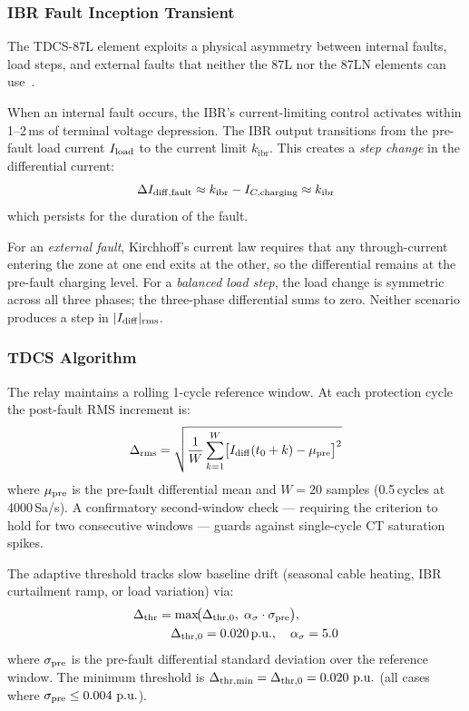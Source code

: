 \documentclass[journal,twoside,10pt]{IEEEtran}
\newcommand{\Idiff}{I_{\mathrm{diff}}}
\newcommand{\kibr}{k_{\mathrm{ibr}}}
\newcommand{\pu}{\,\text{p.u.}}
\begin{document}
\subsubsection{IBR Fault Inception Transient}

The TDCS-87L element exploits a physical asymmetry between internal faults,
load steps, and external faults that neither the 87L nor the 87LN elements
can use~\cite{SAMBP_TR23}.

When an internal fault occurs, the IBR's current-limiting control activates
within 1--2\,ms of terminal voltage depression.  The IBR output transitions
from the pre-fault load current $I_{\rm load}$ to the current limit $\kibr$.
This creates a \emph{step change} in the differential current:
\begin{equation}
  \Delta I_{\rm diff,fault} \approx \kibr - I_{C,\rm charging} \approx \kibr
  \label{eq:tdcs_step}
\end{equation}
which persists for the duration of the fault.

For an \emph{external fault}, Kirchhoff's current law requires that any
through-current entering the zone at one end exits at the other, so the
differential remains at the pre-fault charging level.
For a \emph{balanced load step}, the load change is symmetric across all
three phases; the three-phase differential sums to zero.
Neither scenario produces a step in $|\Idiff|_{\rm rms}$.

\subsubsection{TDCS Algorithm}

The relay maintains a rolling 1-cycle reference window.
At each protection cycle the post-fault RMS increment is:
\begin{equation}
  \Delta_{\rm rms} = \sqrt{\frac{1}{W}\sum_{k=1}^{W}
    \bigl[\Idiff(t_0+k) - \mu_{\rm pre}\bigr]^2}
  \label{eq:tdcs}
\end{equation}
where $\mu_{\rm pre}$ is the pre-fault differential mean and $W = 20$
samples (0.5\,cycles at 4000\,Sa/s).  A confirmatory second-window check
--- requiring the criterion to hold for two consecutive windows --- guards
against single-cycle CT saturation spikes.

The adaptive threshold tracks slow baseline drift (seasonal cable heating,
IBR curtailment ramp, or load variation) via:
\begin{equation}
  \begin{split}
  \Delta_{\rm thr} &= \max\!\bigl(\Delta_{\rm thr,0},\;
                     \alpha_\sigma \cdot \sigma_{\rm pre}\bigr), \\
  &\quad \Delta_{\rm thr,0} = 0.020\pu,\quad \alpha_\sigma = 5.0
  \end{split}
  \label{eq:tdcs_thr}
\end{equation}
where $\sigma_{\rm pre}$ is the pre-fault differential standard deviation
over the reference window.  The minimum threshold is
$\Delta_{\rm thr,min} = \Delta_{\rm thr,0} = 0.020\,\pu$
(all cases where $\sigma_{\rm pre} \leq 0.004\,\pu$).
\end{document}
